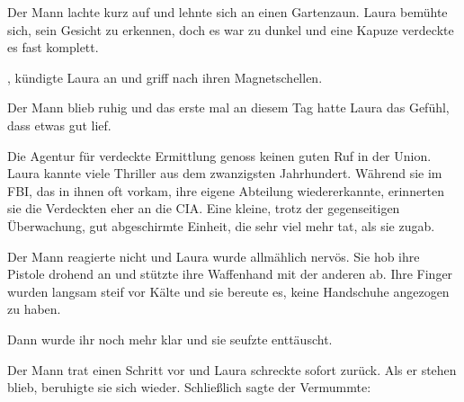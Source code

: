 Der Mann lachte kurz auf und lehnte sich an einen Gartenzaun. Laura bemühte sich, sein Gesicht zu erkennen, doch es war zu dunkel und eine Kapuze verdeckte es fast komplett. 

\par

, kündigte Laura an und griff nach ihren Magnetschellen. 

\par

Der Mann blieb ruhig und das erste mal an diesem Tag hatte Laura das Gefühl, dass etwas gut lief. 

\par

Die Agentur für verdeckte Ermittlung genoss keinen guten Ruf in der Union. Laura kannte viele Thriller aus dem zwanzigsten Jahrhundert. Während sie im FBI, das in ihnen oft vorkam, ihre eigene Abteilung wiedererkannte, erinnerten sie die Verdeckten eher an die CIA. Eine kleine, trotz der gegenseitigen Überwachung, gut abgeschirmte Einheit, die sehr viel mehr tat, als sie zugab.

\par

Der Mann reagierte nicht und Laura wurde allmählich nervös. Sie hob ihre Pistole drohend an und stützte ihre Waffenhand mit der anderen ab. Ihre Finger wurden langsam steif vor Kälte und sie bereute es, keine Handschuhe angezogen zu haben.

\par

Dann wurde ihr noch mehr klar und sie seufzte enttäuscht. 

\par

Der Mann trat einen Schritt vor und Laura schreckte sofort zurück. Als er stehen blieb, beruhigte sie sich wieder. Schließlich sagte der Vermummte: 

